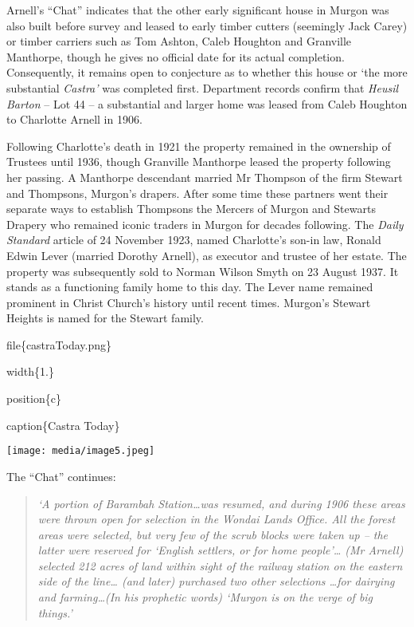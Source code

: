 Arnell's ``Chat'' indicates that the other early significant house in Murgon was also built before survey and leased to early timber cutters (seemingly Jack Carey) or timber carriers such as Tom Ashton, Caleb Houghton and Granville Manthorpe, though he gives no official date for its actual completion. Consequently, it remains open to conjecture as to whether this house or `the more substantial \emph{Castra'} was completed first. Department records confirm that \emph{Heusil Barton} -- Lot 44 -- a substantial and larger home was leased from Caleb Houghton to Charlotte Arnell in 1906.

Following Charlotte's death in 1921 the property remained in the ownership of Trustees until 1936, though Granville Manthorpe leased the property following her passing. A Manthorpe descendant married Mr Thompson of the firm Stewart and Thompsons, Murgon's drapers. After some time these partners went their separate ways to establish Thompsons the Mercers of Murgon and Stewarts Drapery who remained iconic traders in Murgon for decades following. The \emph{Daily Standard} article of 24 November 1923, named Charlotte's son-in law, Ronald Edwin Lever (married Dorothy Arnell), as executor and trustee of her estate. The property was subsequently sold to Norman Wilson Smyth on 23 August 1937. It stands as a functioning family home to this day. The Lever name remained prominent in Christ Church's history until recent times. Murgon's Stewart Heights is named for the Stewart family.

file\{castraToday.png\}

width\{1.\}

position\{c\}

caption\{Castra Today\}

\texttt{[image: media/image5.jpeg]}

The ``Chat'' continues:

\begin{quote}
\emph{`A portion of Barambah Station\ldots was resumed, and during 1906 these areas were thrown open for selection in the Wondai Lands Office. All the forest areas were selected, but very few of the scrub blocks were taken up -- the latter were reserved for `English settlers, or for home people'\ldots{} (Mr Arnell) selected 212 acres of land within sight of the railway station on the eastern side of the line\ldots{} (and later) purchased two other selections \ldots for dairying and farming\ldots(In his prophetic words) `Murgon is on the verge of big things.'}
\end{quote}

